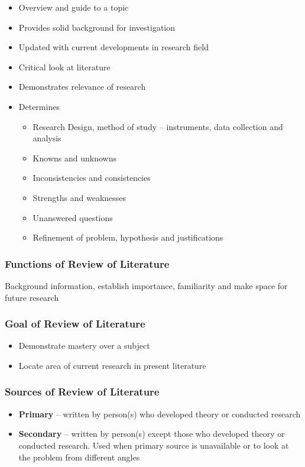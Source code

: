 \documentclass{article}
\begin{document}
\begin{itemize}
    \item Overview and guide to a topic
    \item Provides solid background for investigation
    \item Updated with current developments in research field
    \item Critical look at literature
    \item Demonstrates relevance of research
    \item Determines
        \begin{itemize}
            \item Research Design, method of study -- instruments, data collection and analysis
            \item Knowns and unknowns
            \item Inconsistencies and consistencies
            \item Strengths and weaknesses
            \item Unanswered questions
            \item Refinement of problem, hypothesis and justifications
        \end{itemize}
\end{itemize}

\subsubsection{Functions of Review of Literature}

Background information, establish importance, familiarity and make space for future research

\subsubsection{Goal of Review of Literature}
\begin{itemize}
    \item Demonstrate mastery over a subject
    \item Locate area of current research in present literature
\end{itemize}

\subsubsection{Sources of Review of Literature}

\begin{itemize}
    \item \textbf{Primary} -- written by person(s) who developed theory or conducted research
    \item \textbf{Secondary} -- written by person(s) except those who developed theory or conducted research. Used when primary source is unavailable or to look at the problem from different angles
\end{itemize}
\end{document}
